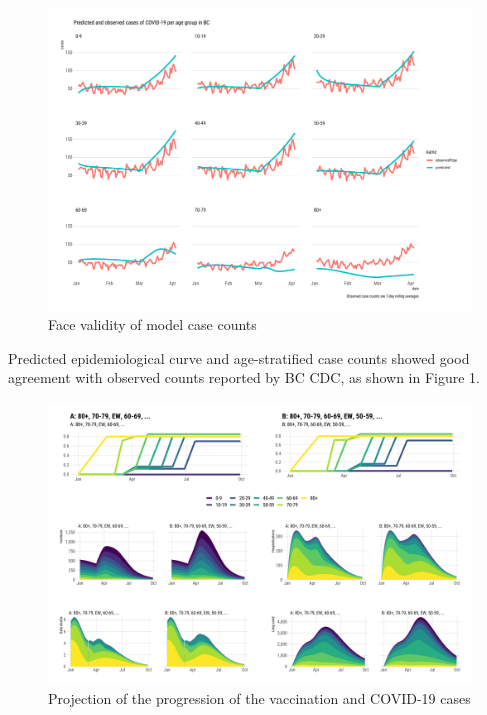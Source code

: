 \documentclass[]{interact}
\theoremstyle{plain}%
\theoremstyle{definition}
\theoremstyle{remark}
\begin{document}
\begin{figure}

{\centering \includegraphics[width=1\linewidth]{../figures/fig-validation} 

}

\caption{Face validity of model case counts}\label{fig:figValidation}
\end{figure}

Predicted epidemiological curve and age-stratified case counts showed
good agreement with observed counts reported by BC CDC, as shown in
Figure 1.

\begin{figure}

{\centering \includegraphics[width=1\linewidth]{../figures/fig-trajectoriesFull} 

}

\caption{Projection of the progression of the vaccination and COVID-19 cases}\label{fig:fig1}
\end{figure}
\end{document}
